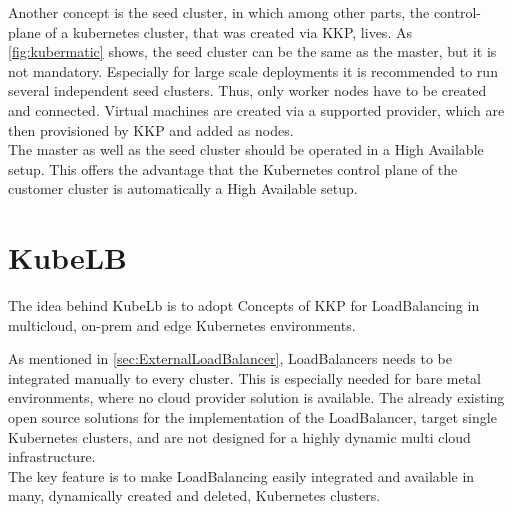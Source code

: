 Another concept is the seed cluster, in which among other parts, the control-plane of a kubernetes cluster, that was created via KKP, lives.
As \autoref{fig:kubermatic} shows, the seed cluster can be the same as the master, but it is not mandatory.
Especially for large scale deployments it is recommended to run several independent seed clusters.
Thus, only worker nodes have to be created and connected.
Virtual machines are created via a supported provider, which are then provisioned by KKP and added as nodes.
\\
The master as well as the seed cluster should be operated in a High Available setup.
This offers the advantage that the Kubernetes control plane of the customer cluster is automatically a High Available setup.

\section{KubeLB}\label{sec:KubeLB}

The idea behind KubeLb is to adopt Concepts of KKP for LoadBalancing in multicloud, on-prem and edge Kubernetes environments.

As mentioned in \autoref{sec:ExternalLoadBalancer}, LoadBalancers needs to be integrated manually to every cluster.
This is especially needed for bare metal environments, where no cloud provider solution is available.
The already existing open source solutions for the implementation of the LoadBalancer, target single Kubernetes clusters, and are not designed for a highly dynamic multi cloud infrastructure.
\\
The key feature is to make LoadBalancing easily integrated and available in many, dynamically created and deleted, Kubernetes clusters.






